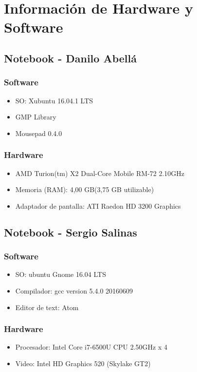 \documentclass[12pt,letterpaper]{scrartcl}
\begin{document}
\newpage
\section{Información de Hardware y Software}


\subsection{ Notebook - Danilo Abellá}
\subsubsection{Software}
\begin{itemize}
\item SO: Xubuntu 16.04.1 LTS
\item GMP Library
\item Mousepad 0.4.0
\end{itemize}

\subsubsection{Hardware}
\begin{itemize}
\item AMD Turion(tm) X2 Dual-Core Mobile RM-72 2.10GHz
\item Memoria (RAM): 4,00 GB(3,75 GB utilizable)
\item Adaptador de pantalla: ATI Raedon HD 3200 Graphics
\end{itemize}



\subsection{Notebook - Sergio Salinas}
\subsubsection{Software}
\begin{itemize}
\item  SO: ubuntu Gnome 16.04 LTS
\item Compilador: gcc version 5.4.0 20160609 
\item Editor de text: Atom
\end{itemize}

\subsubsection{Hardware}
\begin{itemize}
\item Procesador: Intel Core i7-6500U CPU  2.50GHz x 4 
\item Video: Intel HD Graphics 520 (Skylake GT2) 
\end{itemize}
\end{document}
